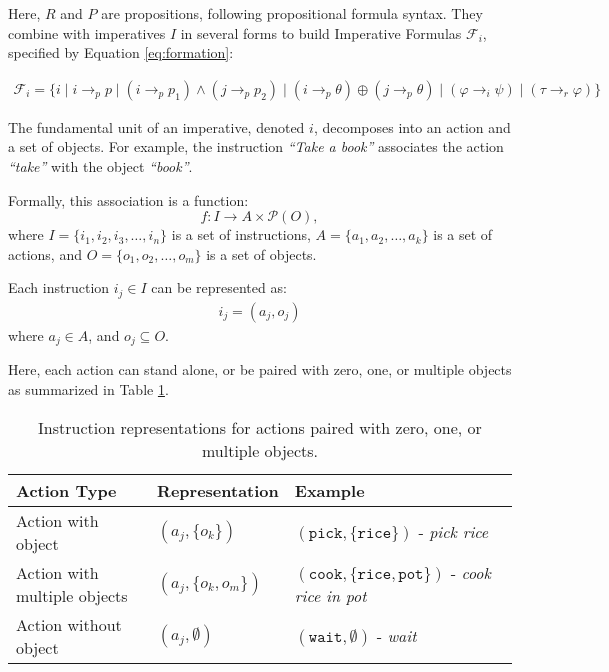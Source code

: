 \documentclass[a4paper,11pt]{lmcs}
\begin{document}
Here, \(R\) and \(P\) are propositions, following propositional formula syntax. They combine with imperatives \(I\) in several forms to build Imperative Formulas \(\mathcal{F}_i\), specified by Equation \ref{eq:formation}:

\begin{eqnarray}
\label{eq:formation}
\mathcal{F}_i = \{
i \mid i \rightarrow_p p \mid (i \rightarrow_p p_1) \wedge (j \rightarrow_p p_2) \mid (i \rightarrow_p \theta) \oplus (j \rightarrow_p \theta) \mid (\varphi \rightarrow_i \psi) \mid (\tau \rightarrow_r \varphi)
\}
\end{eqnarray}

The fundamental unit of an imperative, denoted \(i\), decomposes into an action and a set of objects. For example, the instruction \emph{``Take a book''} associates the action \emph{``take''} with the object \emph{``book''}.

Formally, this association is a function:
\[
f : I \to A \times \mathcal{P}(O),
\]
where \(I = \{ i_1, i_2, i_3, \ldots, i_n \}\) is a set of instructions,
\(A = \{ a_1, a_2, \ldots, a_k \}\) is a set of actions, and
\(O = \{ o_1, o_2, \ldots, o_m \}\) is a set of objects.

Each instruction \(i_j \in I\) can be represented as:
\begin{eqnarray}
\label{eq:ac_ob}
i_j = (a_j, o_j)
\end{eqnarray}
where \(a_j \in A\), and \(o_j \subseteq O\).

Here, each action can stand alone, or be paired with zero, one, or multiple objects as summarized in Table \ref{tab:ac_ob}.

\begin{table}[h!]
\label{tab:ac_ob}
\centering
\begin{tabular}{|l|l|l|}
\hline
\textbf{Action Type}           & \textbf{Representation}             & \textbf{Example}                \\
\hline
Action with object             & \((a_j, \{ o_k \})\)                & \((\texttt{pick}, \{\texttt{rice}\})\) - \emph{pick rice} \\
\hline
Action with multiple objects   & \((a_j, \{ o_k, o_m \})\)          & \((\texttt{cook}, \{\texttt{rice}, \texttt{pot}\})\) - \emph{cook rice in pot} \\
\hline
Action without object          & \((a_j, \emptyset)\)                & \((\texttt{wait}, \emptyset)\) - \emph{wait} \\
\hline
\end{tabular}
\caption{Instruction representations for actions paired with zero, one, or multiple objects.}
\end{table}
\end{document}
